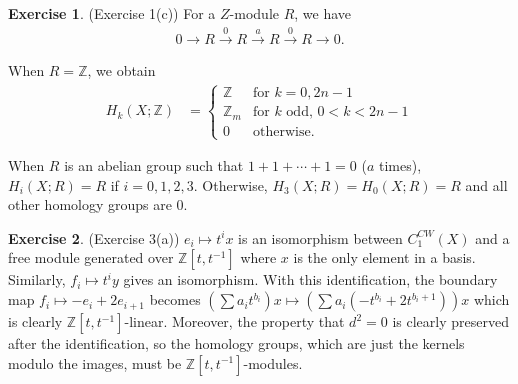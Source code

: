 \documentclass[12pt, psamsfonts]{amsart}
\theoremstyle{definition}
\newtheorem*{exer}{Exercise}
\theoremstyle{remark}
\numberwithin{equation}{section}
\begin{document}
\begin{exer}{(Exercise 1(c))}
  For a $Z$-module $R$, we have
  \begin{align*}
    0 \rightarrow R \xrightarrow{0} R \xrightarrow{a} R \xrightarrow{0} R \rightarrow 0.
  \end{align*}

  When $R = \mathbb{Z}$, we obtain
  \begin{align*}
    H_k(X; \mathbb{Z}) &= \begin{cases}
      \mathbb{Z} & \text{for $k = 0, 2n - 1$} \\
      \mathbb{Z}_m & \text{for $k$ odd, $0 < k < 2n - 1$} \\
      0 & \text{otherwise}.
    \end{cases}
  \end{align*}

  When $R$ is an abelian group such that $1 + 1 + \cdots + 1 = 0$ ($a$ times), $H_i(X; R) = R$ if $i = 0, 1, 2, 3$.
  Otherwise, $H_3(X; R) = H_0(X; R) = R$ and all other homology groups are 0.
\end{exer}

\begin{exer}{(Exercise 3(a))}
  $e_i \mapsto t^ix$ is an isomorphism between $C_1^{CW}(X)$ and a free module generated over $\mathbb{Z}[t, t^{-1}]$ where $x$ is the only element in a basis.
  Similarly, $f_i \mapsto t^iy$ gives an isomorphism.
  With this identification, the boundary map $f_i \mapsto -e_i + 2e_{i + 1}$ becomes $(\sum a_it^{b_i}) x \mapsto (\sum a_i(-t^{b_i} + 2t^{b_i + 1}))x$ which is clearly $\mathbb{Z}[t, t^{-1}]$-linear.
  Moreover, the property that $d^2 = 0$ is clearly preserved after the identification, so the homology groups, which are just the kernels modulo the images, must be $\mathbb{Z}[t, t^{-1}]$-modules.
\end{exer}
\end{document}

